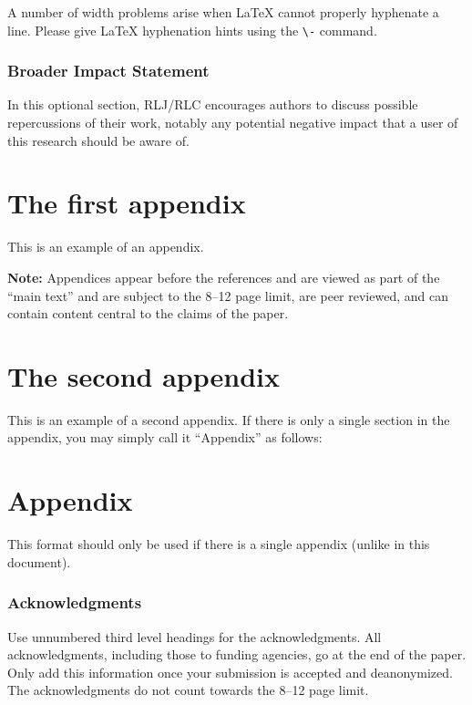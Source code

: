 \documentclass[10pt]{article} %
\theoremstyle{plain}
\theoremstyle{definition}
\theoremstyle{remark}
\begin{document}
A number of width problems arise when LaTeX cannot properly hyphenate a line. Please give LaTeX hyphenation hints using the \verb+\-+ command.

\subsubsection*{Broader Impact Statement}
\label{sec:broaderImpact}
In this optional section, RLJ/RLC encourages authors to discuss possible repercussions of their work, notably any potential negative impact that a user of this research should be aware of. 

\appendix

\section{The first appendix}
\label{sec:appendix1}
This is an example of an appendix. 

\noindent \textbf{Note:} Appendices appear before the references and are viewed as part of the ``main text'' and are subject to the 8--12 page limit, are peer reviewed, and can contain content central to the claims of the paper. 

\section{The second appendix}
\label{sec:appendix2}
This is an example of a second appendix. If there is only a single section in the appendix, you may simply call it ``Appendix'' as follows:

\section*{Appendix}
This format should only be used if there is a single appendix (unlike in this document).

\subsubsection*{Acknowledgments}
\label{sec:ack}
Use unnumbered third level headings for the acknowledgments. All acknowledgments, including those to funding agencies, go at the end of the paper. Only add this information once your submission is accepted and deanonymized. The acknowledgments do not count towards the 8--12 page limit.
\end{document}
